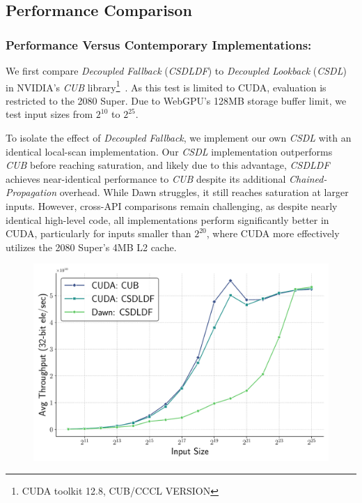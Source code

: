 \documentclass[sigconf]{acmart}
\begin{document}
\subsection{Performance Comparison}
\subsubsection{Performance Versus Contemporary Implementations:}
We first compare \emph{Decoupled Fallback} (\emph{CSDLDF}) to \emph{Decoupled Lookback} (\emph{CSDL}) in NVIDIA’s \emph{CUB} library\footnote{CUDA toolkit 12.8, CUB/CCCL VERSION}~\cite{}. As this test is limited to CUDA, evaluation is restricted to the 2080 Super. Due to WebGPU’s 128MB storage buffer limit, we test input sizes from $2^{10}$ to $2^{25}$\!.

To isolate the effect of \emph{Decoupled Fallback}, we implement our own \emph{CSDL} with an identical local-scan implementation. Our \emph{CSDL} implementation outperforms \emph{CUB} before reaching saturation, and likely due to this advantage, \emph{CSDLDF} achieves near-identical performance to \emph{CUB} despite its additional \emph{Chained-Propagation} overhead. While Dawn struggles, it still reaches saturation at larger inputs. However, cross-API comparisons remain challenging, as despite nearly identical high-level code, all implementations perform significantly better in CUDA, particularly for inputs smaller than $2^{20}$\!, where CUDA more effectively utilizes the 2080 Super’s 4MB L2 cache.

\begin{figure}
  \centering
  \includegraphics[width=\linewidth]{graphics/cuda_plot.pdf}
\end{figure}
\end{document}
